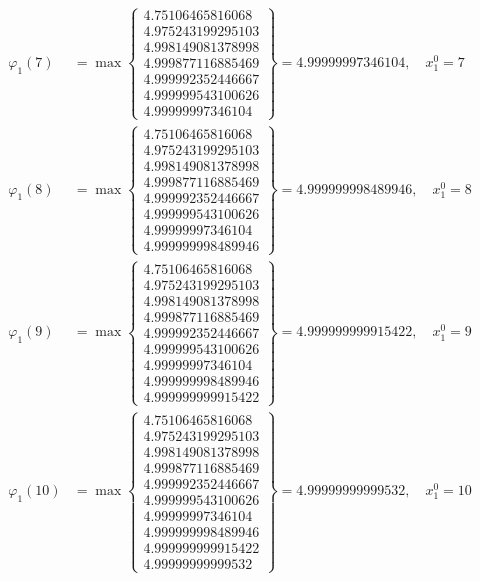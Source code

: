 \documentclass{article}
\begin{document}
\begin{align*}
  
  
  
\varphi_{1}(7) &= \max \left\{ \begin{array}{c}
4.75106465816068 \\
 4.975243199295103 \\
 4.998149081378998 \\
 4.999877116885469 \\
 4.999992352446667 \\
 4.999999543100626 \\
 4.99999997346104
\end{array} \right\} = 4.99999997346104, \quad x_{1}^0 = 7\\
  
  
  
  
\varphi_{1}(8) &= \max \left\{ \begin{array}{c}
4.75106465816068 \\
 4.975243199295103 \\
 4.998149081378998 \\
 4.999877116885469 \\
 4.999992352446667 \\
 4.999999543100626 \\
 4.99999997346104 \\
 4.999999998489946
\end{array} \right\} = 4.999999998489946, \quad x_{1}^0 = 8\\
  
  
  
  
\varphi_{1}(9) &= \max \left\{ \begin{array}{c}
4.75106465816068 \\
 4.975243199295103 \\
 4.998149081378998 \\
 4.999877116885469 \\
 4.999992352446667 \\
 4.999999543100626 \\
 4.99999997346104 \\
 4.999999998489946 \\
 4.999999999915422
\end{array} \right\} = 4.999999999915422, \quad x_{1}^0 = 9\\
  
  
  
  
\varphi_{1}(10) &= \max \left\{ \begin{array}{c}
4.75106465816068 \\
 4.975243199295103 \\
 4.998149081378998 \\
 4.999877116885469 \\
 4.999992352446667 \\
 4.999999543100626 \\
 4.99999997346104 \\
 4.999999998489946 \\
 4.999999999915422 \\
 4.99999999999532
\end{array} \right\} = 4.99999999999532, \quad x_{1}^0 = 10\\
  

\end{align*}
\end{document}
